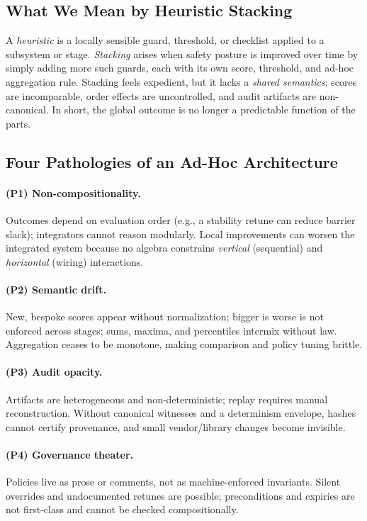 \documentclass[11pt]{article}
\theoremstyle{plain}
\theoremstyle{definition}
\theoremstyle{remark}
\begin{document}
\subsection{What We Mean by Heuristic Stacking}
A \emph{heuristic} is a locally sensible guard, threshold, or checklist applied to a subsystem or stage. \emph{Stacking} arises when safety posture is improved over time by simply adding more such guards, each with its own score, threshold, and ad-hoc aggregation rule. Stacking feels expedient, but it lacks a \emph{shared semantics}: scores are incomparable, order effects are uncontrolled, and audit artifacts are non-canonical. In short, the global outcome is no longer a predictable function of the parts.

\subsection{Four Pathologies of an Ad-Hoc Architecture}
\paragraph{(P1) Non-compositionality.}
Outcomes depend on evaluation order (e.g., a stability retune can reduce barrier slack); integrators cannot reason modularly. Local improvements can worsen the integrated system because no algebra constrains \emph{vertical} (sequential) and \emph{horizontal} (wiring) interactions.

\paragraph{(P2) Semantic drift.}
New, bespoke scores appear without normalization; bigger is worse is not enforced across stages; sums, maxima, and percentiles intermix without law. Aggregation ceases to be monotone, making comparison and policy tuning brittle.

\paragraph{(P3) Audit opacity.}
Artifacts are heterogeneous and non-deterministic; replay requires manual reconstruction. Without canonical witnesses and a determinism envelope, hashes cannot certify provenance, and small vendor/library changes become invisible.

\paragraph{(P4) Governance theater.}
Policies live as prose or comments, not as machine-enforced invariants. Silent overrides and undocumented retunes are possible; preconditions and expiries are not first-class and cannot be checked compositionally.
\end{document}
